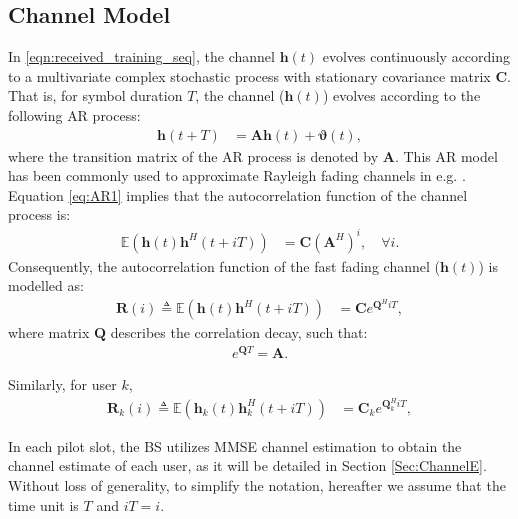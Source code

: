 \documentclass[conference, a4paper, 10pt]{IEEEtran}
\newcommand{\mx}[1]{\mathbf{#1}}
\newcommand{\bs}[1]{\boldsymbol{#1}}
\begin{document}
\subsection{Channel Model}
\vspace{-1mm}
In \eqref{eqn:received_training_seq},
the channel $\mx{h}(t)$ evolves continuously according to a multivariate complex stochastic process
with stationary covariance matrix $\mx{C}$.
That is, for symbol duration $T$, the channel ($\mx{h}(t)$) evolves according to the following \ac{AR} process:
\begin{align}
\label{eq:AR1}
\mx{h}(t+T) &= \mx{A} \mx{h}(t) + \bs{\vartheta}(t),
\end{align}
where the transition matrix of the \ac{AR} process is denoted by $\mx{A}$.
This \ac{AR} model has been commonly used to approximate Rayleigh fading channels in e.g. \cite{Baddour05}.
Equation \eqref{eq:AR1} implies that the autocorrelation function of the channel process is:
\begin{align}
\mathds{E}\left(\mx{h}(t)\mx{h}^H(t+iT)\right) &= \mx{C}\left(\mx{A}^H\right)^i, \quad \forall i.
\end{align}
Consequently, the autocorrelation function of
the fast fading channel ($\mx{h}(t)$) is modelled as:
\begin{align}
\label{eq:autocorr}
\mx{R}(i) \triangleq
\mathds{E}\left(\mx{h}(t)\mx{h}^H(t+iT)\right) &= \mx{C} e^{\mx{Q}^H i T },
\end{align}
where matrix $\mx{Q}$ describes the correlation decay, such that:
\begin{align}
e^{\mx{Q}T} = \mx{A}.
\end{align}

Similarly, for user $k$,
\begin{align}
\label{eq:autocorrk}
\mx{R}_k(i) \triangleq
\mathds{E}\left(\mx{h}_k(t)\mx{h}_k^H(t+iT)\right) &= \mx{C}_k e^{\mx{Q}_k^H i T },
\end{align}

In each pilot slot,
the \ac{BS} utilizes \ac{MMSE} channel estimation to obtain the channel estimate of each user, as it will be detailed in Section \ref{Sec:ChannelE}.
Without loss of generality, to simplify the notation, hereafter we assume that the time unit is $T$ and $iT=i$.
\end{document}
